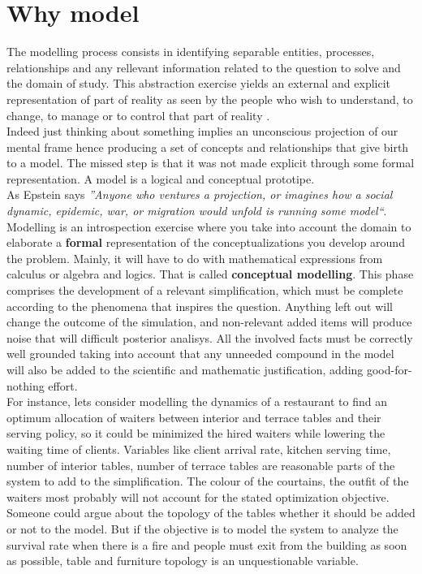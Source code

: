 \documentclass[11pt,oneside,a4paper,openright]{report}
\begin{document}
\section{Why model}
%
The modelling process consists in identifying separable entities, processes, relationships and any rellevant information related to the question to solve and the domain of study. 
This abstraction exercise yields an external and explicit representation of part of reality as seen by the
people who wish to understand, to change, to manage or to control that part of reality \cite{Pidd2003}.\\
Indeed just thinking about something implies an unconscious projection of our mental frame hence producing a set of concepts and relationships that give birth to a model. The missed step is that it was not made explicit through some formal representation. A model is a logical and conceptual prototipe.\\
As Epstein \cite{Epstein2008-p1} says \textit{''Anyone who ventures a projection, or imagines how a social dynamic, epidemic, war, or migration would unfold is running some model``}.\\
Modelling is an introspection exercise where you take into account the domain to elaborate a \textbf{formal} representation of the conceptualizations you develop around the problem. Mainly, it will have to do with mathematical expressions from calculus or algebra and logics. That is called \textbf{conceptual modelling}. This phase comprises the development of a relevant simplification, which must be complete according to the phenomena that inspires the question. Anything left out will change the outcome of the simulation, and non-relevant added items will produce noise that will difficult posterior analisys. All the involved facts must be correctly well grounded taking into account that any unneeded compound in the model will also be added to the scientific and mathematic justification, adding good-for-nothing effort.\\
For instance, lets consider modelling the dynamics of a restaurant to find an optimum allocation of waiters between interior and terrace tables and their serving policy, so it could be minimized the hired waiters while lowering the waiting time of clients. Variables like client arrival rate, kitchen serving time, number of interior tables, number of terrace tables are reasonable parts of the system to add to the simplification. The colour of the courtains, the outfit of the waiters most probably will not account for the stated optimization objective. Someone could argue about the topology of the tables whether it should be added or not to the model. But if the objective is to model the system to analyze the survival rate when there is a fire and people must exit from the building as soon as possible, table and furniture topology is an unquestionable variable.\\
\end{document}
